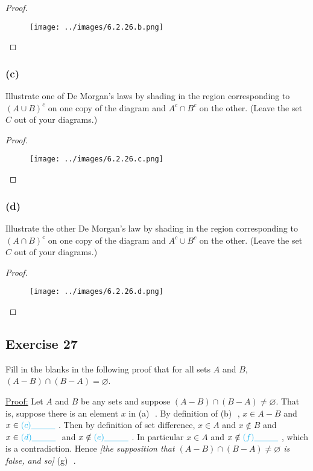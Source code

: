 \documentclass[14pt]{extarticle}
\newcommand{\es}{\varnothing}
\newcommand{\fbl}{\underline{\hspace{1cm}}\,\,}
\newcommand{\cy}{\color{cyan}}
\begin{document}
\begin{proof}
  \begin{figure}[ht!]
    \centering
    \texttt{[image: ../images/6.2.26.b.png]}
  \end{figure}
\end{proof}

\subsubsection{(c)}
Illustrate one of De Morgan’s laws by shading in the region corresponding to \((A \cup B)^c\) on one copy of the
diagram and \(A^c \cap B^c\) on the other. (Leave the set $C$ out of your diagrams.)

\begin{proof}
  \begin{figure}[ht!]
    \centering
    \texttt{[image: ../images/6.2.26.c.png]}
  \end{figure}
\end{proof}

\subsubsection{(d)}
Illustrate the other De Morgan’s law by shading in the region corresponding to \((A \cap B)^c\) on one copy of the
diagram and \(A^c \cup B^c\) on the other. (Leave the set $C$ out of your diagrams.)

\begin{proof}
  \begin{figure}[ht!]
    \centering
    \texttt{[image: ../images/6.2.26.d.png]}
  \end{figure}
\end{proof}

\subsection{Exercise 27}
Fill in the blanks in the following proof that for all sets $A$ and $B$, \((A - B) \cap (B - A) = \es\).

\underline{Proof:} Let $A$ and $B$ be any sets and suppose \((A - B) \cap (B - A) \neq \es\). That is, suppose there
is an element $x$ in {\cy (a) \fbl}. By definition of {\cy (b) \fbl}, \(x \in A - B\) and \(x \in {\cy (c) \fbl}\).
Then by definition of set difference, $x \in A$ and $x \notin B$ and \(x \in {\cy (d) \fbl}\) and \(x \notin {\cy
  (e) \fbl}\). In particular $x \in A$ and \(x \notin {\cy (f) \fbl}\), which is a contradiction. Hence {\it [the
      supposition that \((A - B) \cap (B - A) \neq \es\) is false, and so]} {\cy (g) \fbl}.
\end{document}
